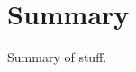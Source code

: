 \documentclass[a4paper,12pt]{article}
\begin{document}
 
\section{Summary}

Summary of stuff.



\end{document}
